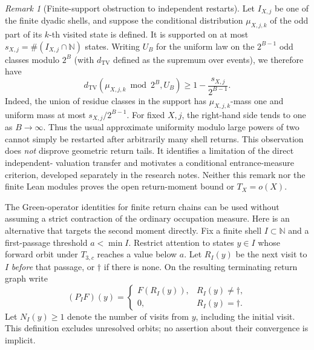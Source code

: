 \documentclass[11pt]{article}
\theoremstyle{remark}
\newtheorem{remark}[theorem]{Remark}
\newcommand{\N}{\mathbb{N}}
\begin{document}
\begin{remark}[Finite-support obstruction to independent restarts]
\label{rem:entrance-support}
Let $I_{X,j}$ be one of the finite dyadic shells, and suppose the
conditional distribution $\mu_{X,j,k}$ of the odd part of its $k$-th
visited state is defined. It is supported on at most
$s_{X,j}=\#(I_{X,j}\cap\mathbb N)$ states. Writing $U_B$ for the
uniform law on the $2^{B-1}$ odd classes modulo $2^B$ (with $d_{\mathrm{TV}}$ defined as the supremum over events), we therefore have
\[
 d_{\mathrm{TV}}(\mu_{X,j,k}\bmod 2^B,U_B)
 \ge 1-\frac{s_{X,j}}{2^{B-1}}.
\]
Indeed, the union of residue classes in the support has
$\mu_{X,j,k}$-mass one and uniform mass at most
$s_{X,j}/2^{B-1}$. For fixed $X,j$, the right-hand side tends to one
as $B\to\infty$. Thus the usual approximate uniformity modulo large
powers of two cannot simply be restarted after arbitrarily many
shell returns. This observation does \emph{not} disprove geometric
return tails. It identifies a limitation of the direct independent-
valuation transfer and motivates a conditional entrance-measure
criterion, developed separately in the research notes. Neither this
remark nor the finite Lean modules proves the open return-moment
bound or $T_X=o(X)$.
\end{remark}

The Green-operator identities for finite return chains can be used without
assuming a strict contraction of the ordinary occupation measure.  Here is
an alternative that targets the second moment directly.
Fix a finite shell $I\subset\N$ and a first-passage threshold $a<\min I$.
Restrict attention to states $y\in I$ whose forward orbit under $T_{3,c}$
reaches a value below $a$.  Let $R_I(y)$ be the next visit to $I$
\emph{before} that passage, or $\dagger$ if there is none.  On the
resulting terminating return graph write
\[
  (P_I F)(y)=
  \begin{cases}F(R_I(y)),&R_I(y)\ne\dagger,\\
  0,&R_I(y)=\dagger.
  \end{cases}
\]
Let $N_I(y)\ge1$ denote the number of visits from $y$, including the
initial visit.  This definition excludes unresolved orbits; no assertion
about their convergence is implicit.
\end{document}
